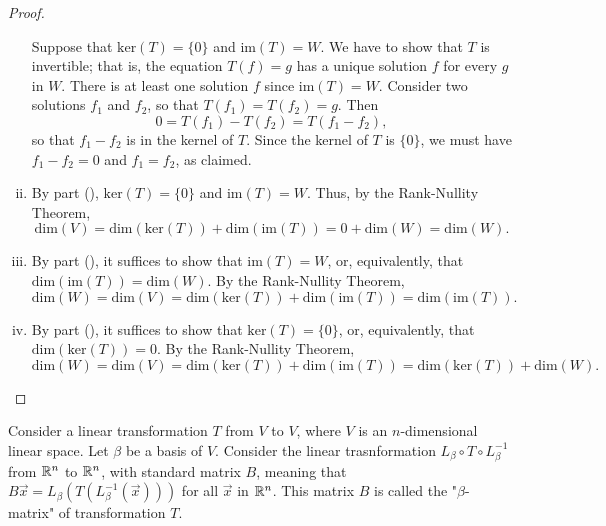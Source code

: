 \documentclass[a4paper,8pt]{article}
\begin{document}
\begin{outline}
\begin{proof}
\begin{enumerate}[i.]
          \backward
            Suppose that \(\text{ker}(T) = \{0\}\) and \(\text{im}(T)=W\). We have to show that \(T\) is
            invertible; that is, the equation \(T(f) = g\) has a unique solution \(f\) for every \(g\) in \(W\).
            There is at least one solution \(f\) since \(\text{im}(T) = W\). Consider two solutions \(f_1\) and
            \(f_2\), so that \(T(f_1) = T(f_2) = g\). Then \[0 = T(f_1) - T(f_2) = T(f_1-f_2),\] so that
            \(f_1-f_2\) is in the kernel of \(T\). Since the kernel of \(T\) is \(\{0\}\), we must have
            \(f_1 - f_2 = 0\) and \(f_1=f_2\), as claimed.
          \item
            By part (), \(\text{ker}(T) = \{0\}\) and \(\text{im}(T) = W\). Thus, by the
            Rank-Nullity Theorem, \[\text{dim}(V) = \text{dim}(\text{ker}(T)) + \text{dim}(\text{im}(T)) =
            0 + \text{dim}(W) = \text{dim}(W)\text{.}\]
          \item
            By part (), it suffices to show that \(\text{im}(T)=W\), or, equivalently, that
            \(\text{dim}(\text{im}(T)) = \text{dim}(W)\). By the Rank-Nullity Theorem, \[\text{dim}(W) =
            \text{dim}(V) = \text{dim}(\text{ker}(T)) + \text{dim}(\text{im}(T)) = \text{dim}(\text{im}(T))\text{.}\]
          \item
            By part (), it suffices to show that \(\text{ker}(T) = \{0\}\), or, equivalently,
            that \(\text{dim}(\text{ker}(T)) = 0\). By the Rank-Nullity Theorem, \[\text{dim}(W) = \text{dim}(V)
            = \text{dim}(\text{ker}(T)) + \text{dim}(\text{im}(T)) = \text{dim}(\text{ker}(T)) +
            \text{dim}(W)\text{.}\]
      \end{enumerate}
    \end{proof}



      Consider a linear transformation \(T\) from \(V\) to \(V\), where \(V\) is an \(n\)-dimensional linear space.
      Let \(\beta\) be a basis of \(V\). Consider the linear trasnformation \(L_{\beta}\circ T\circ L_{\beta}^{-1}\)
     from \(\mathbb{R}^n\) to \(\mathbb{R}^n\), with standard matrix \(B\), meaning that \(B\vec{x} =
     L_{\beta}(T(L_{\beta}^{-1}(\vec{x})))\) for all \(\vec{x}\) in \(\mathbb{R}^n\). This matrix \(B\) is called the
     "\(\beta\)-matrix" of transformation \(T\).


\end{outline}
\end{document}
